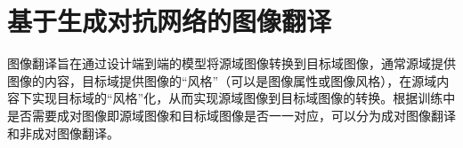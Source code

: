 












\section{基于生成对抗网络的图像翻译}
图像翻译旨在通过设计端到端的模型将源域图像转换到目标域图像，通常源域提供图像的内容，目标域提供图像的“风格”（可以是图像属性或图像风格），在源域内容下实现目标域的“风格”化，从而实现源域图像到目标域图像的转换。根据训练中是否需要成对图像即源域图像和目标域图像是否一一对应，可以分为成对图像翻译和非成对图像翻译。


